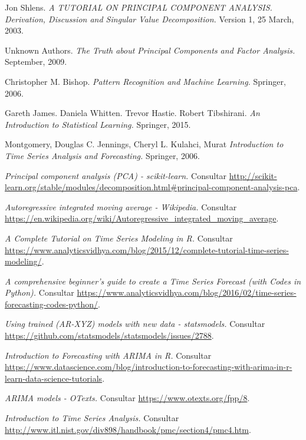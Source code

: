 \documentclass[11pt,spanish,listoffigures,listoftables]{tfgetsinf}
\begin{document}
\begin{thebibliography}{10}

   Jon Shlens.
   \newblock \textit{A TUTORIAL ON PRINCIPAL COMPONENT ANALYSIS. Derivation, Discussion and Singular Value Decomposition.}
   \newblock Version 1, 25 March, 2003.

   Unknown Authors.
   \newblock \textit{The Truth about Principal Components and Factor Analysis.}
    September, 2009.
   
   Christopher M. Bishop.
   \newblock \textit{Pattern Recognition and Machine Learning.}
   \newblock Springer, 2006.   

   Gareth James.
   Daniela Whitten.
   Trevor Hastie.
   Robert Tibshirani.
   \newblock \textit{An Introduction to Statistical Learning.}
   \newblock Springer, 2015.

   Montgomery, Douglas C.
   Jennings, Cheryl L.
   Kulahci, Murat
   \newblock \textit{Introduction to Time Series Analysis and Forecasting.}
   \newblock Springer, 2006.

   \textit{Principal component analysis (PCA) - scikit-learn.}
   \newblock Consultar 
   \url{http://scikit-learn.org/stable/modules/decomposition.html#principal-component-analysis-pca}.

   \textit{Autoregressive integrated moving average - Wikipedia.}
   \newblock Consultar 
   \url{https://en.wikipedia.org/wiki/Autoregressive_integrated_moving_average}.

   \textit{A Complete Tutorial on Time Series Modeling in R.}
   \newblock Consultar 
   \url{https://www.analyticsvidhya.com/blog/2015/12/complete-tutorial-time-series-modeling/}.

   \textit{A comprehensive beginner’s guide to create a Time Series Forecast (with Codes in Python).}
   \newblock Consultar 
   \url{https://www.analyticsvidhya.com/blog/2016/02/time-series-forecasting-codes-python/}.

   \textit{Using trained (AR-XYZ) models with new data - statsmodels.}
   \newblock Consultar 
   \url{https://github.com/statsmodels/statsmodels/issues/2788}.

   \textit{Introduction to Forecasting with ARIMA in R.}
   \newblock Consultar 
   \url{https://www.datascience.com/blog/introduction-to-forecasting-with-arima-in-r-learn-data-science-tutorials}.

   \textit{ARIMA models - OTexts.}
   \newblock Consultar 
   \url{https://www.otexts.org/fpp/8}.

   \textit{Introduction to Time Series Analysis.}
   \newblock Consultar 
   \url{http://www.itl.nist.gov/div898/handbook/pmc/section4/pmc4.htm}.

\end{thebibliography}
\cleardoublepage

%
\end{document}
